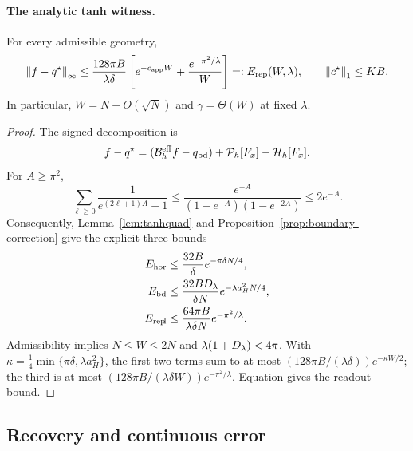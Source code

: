 \paragraph{The analytic tanh witness.}
\begin{theorem}
\label{thm:witness}
For every admissible geometry,
\begin{equation}
 \left\lVert f-q^\star\right\rVert_\infty\le
 \frac{128\pi B}{\lambda\delta}
 \left[e^{-c_{\mathrm{app}} W}+\frac{e^{-\pi^2/\lambda}}W\right]
 =:E_{\mathrm{rep}}(W,\lambda),\qquad \left\lVert c^\star\right\rVert_1\le KB.
 \label{eq:Erep}
\end{equation}
In particular, $W=N+O(\sqrt N)$ and $\gamma=\Theta(W)$ at fixed $\lambda$.
\end{theorem}
\begin{proof}
The signed decomposition is
\begin{equation}
 f-q^\star=(\mathcal B_h^{\rm eff}f-q_{\rm bd})
            +\mathcal P_h[F_x]-\mathcal H_h[F_x].
 \label{eq:corrected-decomp}
\end{equation}
For $A\ge\pi^2$,
\[
 \sum_{\ell\ge0}\frac1{e^{(2\ell+1)A}-1}
 \le\frac{e^{-A}}{(1-e^{-A})(1-e^{-2A})}\le2e^{-A}.
\]
Consequently, Lemma~\ref{lem:tanhquad} and
Proposition~\ref{prop:boundary-correction} give the explicit three bounds
\begin{align*}
 E_{\rm hor}&\le\frac{32B}\delta e^{-\pi\delta N/4},\\
 E_{\rm bd}&\le\frac{32BD_\lambda}{\delta N}e^{-\lambda a_H^2N/4},\\
 E_{\rm rep\!l}&\le\frac{64\pi B}{\lambda\delta N}e^{-\pi^2/\lambda}.
\end{align*}
Admissibility implies $N\le W\le2N$ and
$\lambda(1+D_\lambda)<4\pi$. With
$\kappa=\tfrac14\min\{\pi\delta,\lambda a_H^2\}$, the first two terms
sum to at most $(128\pi B/(\lambda\delta))e^{-\kappa W/2}$;
the third is at most $(128\pi B/(\lambda\delta W))e^{-\pi^2/\lambda}$.
Equation  gives the readout bound.
\end{proof}

\subsection{Recovery and continuous error}
\label{sec:recovery}

